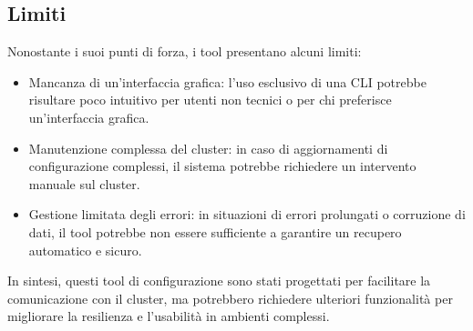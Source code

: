 \subsection{Limiti}
Nonostante i suoi punti di forza, i tool presentano alcuni limiti:
\begin{itemize}
  \item Mancanza di un'interfaccia grafica: l'uso esclusivo di una CLI potrebbe risultare poco 
      intuitivo per utenti non tecnici o per chi preferisce un'interfaccia grafica.
  \item Manutenzione complessa del cluster: in caso di aggiornamenti di configurazione complessi, 
      il sistema potrebbe richiedere un intervento manuale sul cluster.
  \item Gestione limitata degli errori: in situazioni di errori prolungati o corruzione di dati, 
      il tool potrebbe non essere sufficiente a garantire un recupero automatico e sicuro.
\end{itemize}
In sintesi, questi tool di configurazione sono stati progettati per facilitare la comunicazione 
con il cluster, ma potrebbero richiedere ulteriori funzionalità per migliorare la resilienza e 
l'usabilità in ambienti complessi.
